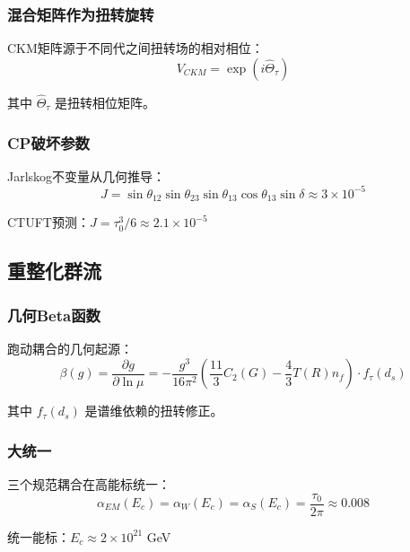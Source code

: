 \subsubsection{混合矩阵作为扭转旋转}

CKM矩阵源于不同代之间扭转场的相对相位：
\begin{equation}
    V_{CKM} = \exp(i \hat{\Theta}_\tau)
\end{equation}

其中 $\hat{\Theta}_\tau$ 是扭转相位矩阵。

\subsubsection{CP破坏参数}

Jarlskog不变量从几何推导：
\begin{equation}
    J = \sin\theta_{12} \sin\theta_{23} \sin\theta_{13} \cos\theta_{13} \sin\delta \approx 3 \times 10^{-5}
\end{equation}

CTUFT预测：$J = \tau_0^3/6 \approx 2.1 \times 10^{-5}$

\subsection{重整化群流}

\subsubsection{几何Beta函数}

跑动耦合的几何起源：
\begin{equation}
    \beta(g) = \frac{\partial g}{\partial \ln\mu} = -\frac{g^3}{16\pi^2} \left(\frac{11}{3}C_2(G) - \frac{4}{3}T(R)n_f\right) \cdot f_\tau(d_s)
\end{equation}

其中 $f_\tau(d_s)$ 是谱维依赖的扭转修正。

\subsubsection{大统一}

三个规范耦合在高能标统一：
\begin{equation}
    \alpha_{EM}(E_c) = \alpha_W(E_c) = \alpha_S(E_c) = \frac{\tau_0}{2\pi} \approx 0.008
\end{equation}

统一能标：$E_c \approx 2 \times 10^{21}$ GeV


